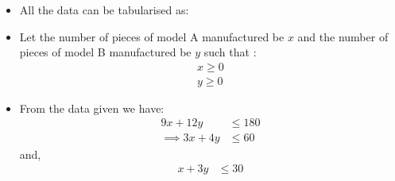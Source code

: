 \begin{itemize}
\item All the data can be tabularised as:
%
\begin{table}[!ht]
\centering
{}
\caption{Labour Hours and Profit for each piece}
\label{opt/2/35/tab:table1}
\end{table}
\item Let the number of pieces of model A manufactured be $x$ and
the number of pieces of model B manufactured be $y$ such that : 
\begin{align}
    x \geq 0 
    \\
    y \geq 0 
\end{align}
\item From the data given we have:
\begin{align}
    9x+12y &\leq 180 \\
    \implies 3x+4y&\leq60
\end{align}
and,
\begin{align}
    x+3y &\leq 30 
\end{align}


\end{itemize}
